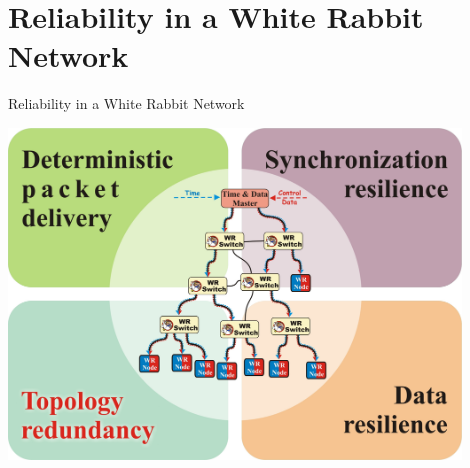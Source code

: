 \documentclass[compress, red]{beamer}
\begin{document}
\section{Reliability in a White Rabbit Network}
\begin{frame}{Reliability in a White Rabbit Network}


    \begin{center}
    \includegraphics[width=0.9\textwidth]{robustness/sub_domains-old.pdf}
    \end{center}

  

\end{frame}
\end{document}
